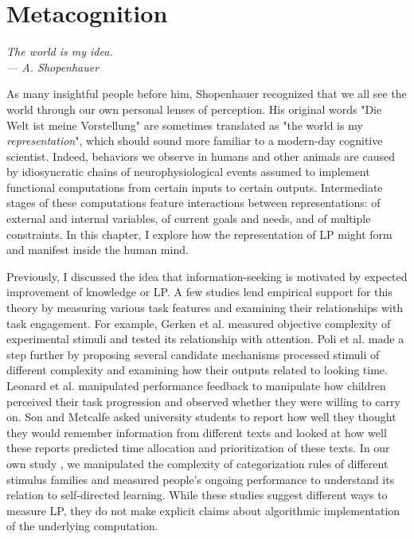 \chapter{Metacognition}\label{ch:metacognition}

\begin{flushright}{\slshape
    The world is my idea. \\
    --- A. Shopenhauer \cite{schopenhauer_world_2016}}
\end{flushright}
As many insightful people before him, Shopenhauer recognized that we all see the world through our own personal lenses of perception. His original words "Die Welt ist meine Vorstellung" are sometimes translated as "the world is my \emph{representation}", which should sound more familiar to a modern-day cognitive scientist. Indeed, behaviors we observe in humans and other animals are caused by idiosyncratic chains of neurophysiological events assumed to implement functional computations from certain inputs to certain outputs. Intermediate stages of these computations feature interactions between representations: of external and internal variables, of current goals and needs, and of multiple constraints. In this chapter, I explore how the representation of \acf{LP} might form and manifest inside the human mind. 

Previously, I discussed the idea that information-seeking is motivated by expected improvement of knowledge or \ac{LP}. A few studies lend empirical support for this theory by measuring various task features and examining their relationships with task engagement. For example, Gerken et al. \cite{gerken_infants_2011} measured objective complexity of experimental stimuli and tested its relationship with attention. Poli et al. \cite{poli_infants_2020} made a step further by proposing several candidate mechanisms processed stimuli of different complexity and examining how their outputs related to looking time. Leonard et al. \cite{leonard_young_2021} manipulated performance feedback to manipulate how children perceived their task progression and observed whether they were willing to carry on. Son and Metcalfe \cite{son_metacognitive_2000} asked university students to report how well they thought they would remember information from different texts and looked at how well these reports predicted time allocation and prioritization of these texts. In our own study \cite{ten_humans_2021}, we manipulated the complexity of categorization rules of different stimulus families and measured people's ongoing performance to understand its relation to self-directed learning. While these studies suggest different ways to measure \ac{LP}, they do not make explicit claims about algorithmic implementation of the underlying computation.

